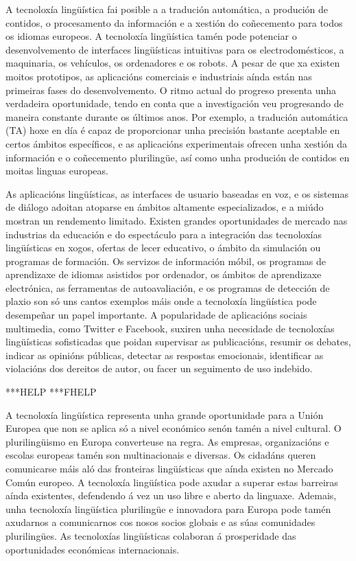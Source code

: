 \begin{multicols}{2}
    A tecnoloxía lingüística fai posible a a tradución automática, a produción de contidos, o procesamento da información e a xestión do coñecemento para todos os idiomas europeos. A tecnoloxía lingüística tamén pode potenciar o desenvolvemento de interfaces lingüísticas intuitivas para os electrodomésticos, a maquinaria, os vehículos, os ordenadores e os robots. A pesar de que xa existen moitos prototipos, as aplicacións comerciais e industriais aínda están nas primeiras fases do desenvolvemento. O ritmo actual do progreso presenta unha verdadeira oportunidade, tendo en conta que a investigación veu progresando de maneira constante durante os últimos anos. Por exemplo, a tradución automática (TA) hoxe en día é capaz de proporcionar unha precisión bastante aceptable en certos ámbitos específicos, e as aplicacións experimentais ofrecen unha xestión da información e o coñecemento plurilingüe, así como unha produción de contidos en moitas linguas europeas. 

As aplicacións lingüísticas, as interfaces de usuario baseadas en voz, e os sistemas de diálogo adoitan atoparse en ámbitos altamente especializados, e a miúdo mostran un rendemento limitado. Existen grandes oportunidades de mercado nas industrias da educación e do espectáculo para a integración das tecnoloxías lingüísticas en xogos, ofertas de lecer educativo, o ámbito da simulación ou programas de formación. Os servizos de información móbil, os programas de aprendizaxe de idiomas asistidos por ordenador, os ámbitos de aprendizaxe electrónica, as ferramentas de autoavaliación, e os programas de detección de plaxio son só uns cantos exemplos máis onde a tecnoloxía lingüística pode desempeñar un papel importante. A popularidade de aplicacións sociais multimedia, como Twitter e Facebook, suxiren unha necesidade de tecnoloxías lingüísticas sofisticadas que poidan supervisar as publicacións, resumir os debates, indicar as opinións públicas, detectar as respostas emocionais, identificar as violacións dos dereitos de autor, ou facer un seguimento de uso indebido.

 ***HELP  ***FHELP

A tecnoloxía lingüística representa unha grande oportunidade para a Unión Europea que non se aplica só a nivel económico senón tamén a nivel cultural. O plurilingüismo en Europa converteuse na regra. As empresas, organizacións e escolas europeas tamén son multinacionais e diversas. Os cidadáns queren comunicarse máis aló das fronteiras lingüísticas que aínda existen no Mercado Común europeo. A tecnoloxía lingüística pode axudar a superar estas barreiras aínda existentes, defendendo á vez un uso libre e aberto da linguaxe. Ademais, unha tecnoloxía lingüística plurilingüe e innovadora para Europa pode tamén axudarnos a comunicarnos cos nosos socios globais e as súas comunidades plurilingües. As tecnoloxías lingüísticas colaboran á prosperidade das oportunidades económicas internacionais.




\end{multicols}
